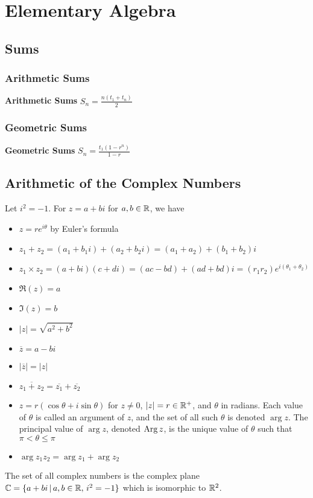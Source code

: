 \pagebreak





\section{Elementary Algebra}

\subsection{Sums}

\subsubsection{Arithmetic Sums}

\textbf{Arithmetic Sums} $S_n = \frac{n(t_{1} + t_{n})}{2}$

\subsubsection{Geometric Sums}

\textbf{Geometric Sums} $S_n = \frac{t_{1}(1-r^{n})}{1-r}$

\subsection{Arithmetic of the Complex Numbers}

Let $i^2 = -1$. For $z = a + bi$ for $a, b \in \mathbb{R}$, we have \begin{itemize}
	\item $z = re^{i\theta}$ by Euler's formula
	\item $z_1 + z_2 = (a_1 + b_1i) + (a_2 + b_2i) = (a_1 + a_2) + (b_1 + b_2)i$
	\item $z_1 \times z_2 = (a+bi)(c+di) = (ac-bd)+(ad+bd)i = (r_1r_2) e^{i(\theta_1 + \theta_2)}$
	\item $\Re (z) = a$
	\item $\Im (z) = b$
	\item $|z| = \sqrt{a^2 + b^2}$
	\item $\overline{z} = a - bi$
	\item $|\overline{z}| = |z|$
	\item $\overline{z_1 + z_2} = \overline{z_1} + \overline{z_2}$
	\item $z = r(\cos{\theta} + i\sin{\theta})$ for $z \neq 0$, $|z| = r \in \mathbb{R}^+$, and $\theta$ in radians. Each value of $\theta$ is called an argument of $z$, and the set of all such $\theta$ is denoted $\arg z$. The principal value of $\arg z$, denoted $\operatorname{Arg}{z}$, is the unique value of $\theta$ such that $\pi < \theta \leq \pi$
	\item $\arg{z_1z_2} = \arg{z_1} + \arg{z_2}$
\end{itemize} The set of all complex numbers is the complex plane $\mathbb{C} = \{ a + bi \, | \, a, b \in \mathbb{R}, \, i^2 = -1 \}$ which is isomorphic to $\mathbb{R}^2$.


